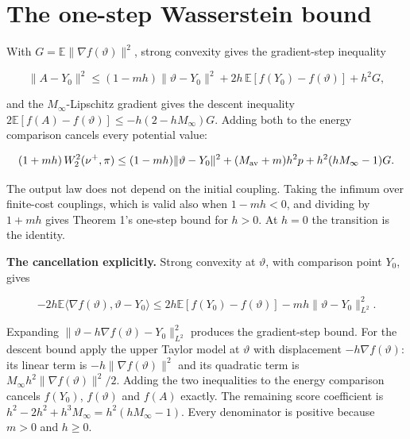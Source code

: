 \documentclass[11pt,a4paper]{report}
\begin{document}
\section{\texorpdfstring{The one-step Wasserstein bound}{The one-step Wasserstein bound}}


With
\(G=\mathbb E\|\nabla f(\vartheta)\|^2\), strong convexity gives the
gradient-step inequality


\[\|A-Y_0\|^2\le(1-mh)\|\vartheta-Y_0\|^2+2h\,\mathbb E[f(Y_0)-f(\vartheta)]+h^2G,\]


and the \(M_\infty\)-Lipschitz gradient gives the descent inequality
\(2\mathbb E[f(A)-f(\vartheta)]\le-h(2-hM_\infty)G\). Adding both to the energy
comparison cancels every potential value:


\[(1+mh)\,W_2^2(\nu^+,\pi)\le(1-mh)\|\vartheta-Y_0\|^2+(M_{\rm av}+m)h^2p
+h^2(hM_\infty-1)G.\]


The output law does not depend on the initial coupling. Taking the
infimum over finite-cost couplings, which is valid also when \(1-mh<0\),
and dividing by \(1+mh\) gives Theorem 1's one-step bound for \(h>0\). At
\(h=0\) the transition is the identity.




\textbf{The cancellation explicitly.} Strong convexity at \(\vartheta\), with comparison point \(Y_0\), gives

\[-2h\mathbb E\langle\nabla f(\vartheta),\vartheta-Y_0\rangle\le2h\mathbb E[f(Y_0)-f(\vartheta)]-mh\|\vartheta-Y_0\|_{L^2}^2.\]

Expanding \(\|\vartheta-h\nabla f(\vartheta)-Y_0\|_{L^2}^2\) produces the gradient-step bound. For the descent bound apply the upper Taylor model at \(\vartheta\) with displacement \(-h\nabla f(\vartheta)\): its linear term is \(-h\|\nabla f(\vartheta)\|^2\) and its quadratic term is \(M_\infty h^2\|\nabla f(\vartheta)\|^2/2\). Adding the two inequalities to the energy comparison cancels \(f(Y_0)\), \(f(\vartheta)\) and \(f(A)\) exactly. The remaining score coefficient is \(h^2-2h^2+h^3M_\infty=h^2(hM_\infty-1)\). Every denominator is positive because \(m>0\) and \(h\ge0\).
\end{document}
